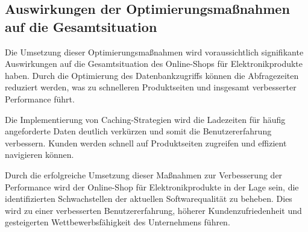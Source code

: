 \subsection{Auswirkungen der Optimierungsmaßnahmen auf die Gesamtsituation}
Die Umsetzung dieser Optimierungsmaßnahmen wird voraussichtlich signifikante Auswirkungen auf die Gesamtsituation des Online-Shops für Elektronikprodukte haben. Durch die Optimierung des Datenbankzugriffs können die Abfragezeiten reduziert werden, was zu schnelleren Produktseiten und insgesamt verbesserter Performance führt.

Die Implementierung von Caching-Strategien wird die Ladezeiten für häufig angeforderte Daten deutlich verkürzen und somit die Benutzererfahrung verbessern. Kunden werden schnell auf Produktseiten zugreifen und effizient navigieren können.

Durch die erfolgreiche Umsetzung dieser Maßnahmen zur Verbesserung der Performance wird der Online-Shop für Elektronikprodukte in der Lage sein, die identifizierten Schwachstellen der aktuellen Softwarequalität zu beheben. Dies wird zu einer verbesserten Benutzererfahrung, höherer Kundenzufriedenheit und gesteigerten Wettbewerbsfähigkeit des Unternehmens führen.